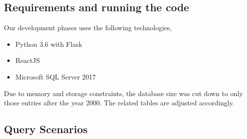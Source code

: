 \documentclass{sig-alternate}
\begin{document}
\subsection{Requirements and running the code}
Our development phases uses the following technologies,
\begin{itemize}
	\item Python 3.6 with Flask
	\item ReactJS 
	\item Microsoft SQL Server 2017
\end{itemize}
Due to memory and storage constraints, the database size was cut down to only those entries after the year 2000. The related tables are adjusted accordingly.
	\subsection{Query Scenarios}
\end{document}
